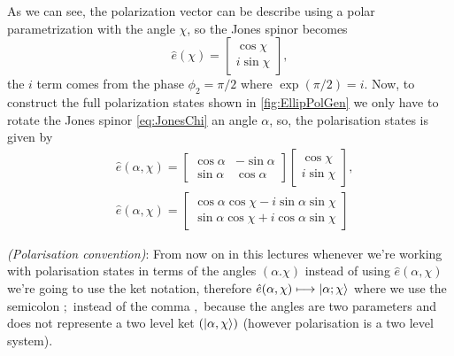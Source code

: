             As we can see, the polarization vector can be describe using a polar parametrization with the angle $\chi$, so the Jones spinor becomes
            \begin{equation}\label{eq:JonesChi}
                \hat{e}(\chi) =
                \begin{bmatrix}
                    \cos\chi\\
                    i\sin\chi
                \end{bmatrix},
            \end{equation}
            the $i$ term comes from the phase $\phi_2 = \pi/2$ where $\exp\left(\pi/2\right)=i$. Now, to construct the full polarization states shown in \ref{fig:EllipPolGen} we only have to rotate the Jones spinor \ref{eq:JonesChi} an angle $\alpha$, so, the polarisation states is given by
            \begin{align*}
                & \hat{e}(\alpha,\chi) =
                \begin{bmatrix}
                    \cos\alpha & -\sin\alpha\\
                    \sin\alpha & \cos\alpha
                \end{bmatrix}
                \begin{bmatrix}
                    \cos\chi\\
                    i\sin\chi
                \end{bmatrix},\\
                & \hat{e}(\alpha,\chi) = 
                \begin{bmatrix}
                    \cos\alpha \cos\chi - i\sin\alpha \sin\chi \\
                    \sin\alpha \cos\chi + i\cos\alpha\sin\chi
                \end{bmatrix}
            \end{align*}

            \begin{myDef}
                \textit{(Polarisation convention)}: From now on in this lectures whenever we're working with polarisation states in terms of the angles $(\alpha.\chi)$ instead of using $\hat{e}(\alpha,\chi)$ we're going to use the ket notation, therefore $\hat{e}(\alpha,\chi) \longmapsto \ket{\alpha;\chi}$ where we use the semicolon $;$ instead of the comma $,$ because the angles are two parameters and does not represente a two level ket $(\ket{\alpha,\chi} )$ (however polarisation is a two level system).
            \end{myDef}

